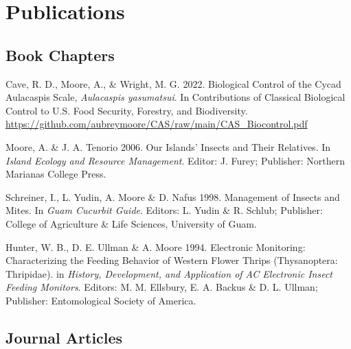 \documentclass[12pt,english]{simplecv}
\begin{document}
%

\section{Publications}

\subsection{Book Chapters}
\begin{thebibliography}{10}

\bibitem{} Cave, R. D., Moore, A., \& Wright, M. G. 2022. Biological Control of the Cycad Aulacaspis Scale, \textit{Aulacaspis yasumatsui}. In Contributions of Classical Biological Control to U.S. Food Security, Forestry, and Biodiversity. \url{https://github.com/aubreymoore/CAS/raw/main/CAS_Biocontrol.pdf}

Moore, A. \& J. A. Tenorio 2006. Our Islands' Insects
and Their Relatives. In \emph{Island Ecology and Resource Management}.
Editor: J. Furey; Publisher: Northern Marianas College Press.

Schreiner, I., L. Yudin, A. Moore \& D. Nafus 1998.
Management of Insects and Mites. In \emph{Guam Cucurbit Guide}. Editors:
L. Yudin \& R. Schlub; Publisher: College of Agriculture \& Life Sciences,
University of Guam.

Hunter, W. B., D. E. Ullman \& A. Moore 1994. Electronic
Monitoring: Characterizing the Feeding Behavior of Western Flower
Thrips (Thysanoptera: Thripidae). in \emph{History, Development, and
Application of AC Electronic Insect Feeding Monitors}. Editors: M.
M. Ellsbury, E. A. Backus \& D. L. Ullman; Publisher: Entomological
Society of America.
 
\end{thebibliography}

\subsection{Journal Articles}
\end{document}
